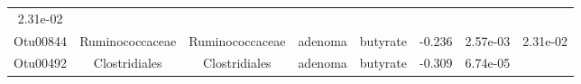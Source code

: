 \documentclass[11pt,]{article}
\begin{document}
\begin{longtable}[]{@{}cccccccc@{}}
\begin{minipage}[t]{0.08\columnwidth}
2.31e-02\strut
\end{minipage}\tabularnewline
\begin{minipage}[t]{0.08\columnwidth}\centering\strut
Otu00844\strut
\end{minipage} & \begin{minipage}[t]{0.15\columnwidth}\centering\strut
Ruminococcaceae\strut
\end{minipage} & \begin{minipage}[t]{0.15\columnwidth}\centering\strut
Ruminococcaceae\strut
\end{minipage} & \begin{minipage}[t]{0.08\columnwidth}\centering\strut
adenoma\strut
\end{minipage} & \begin{minipage}[t]{0.09\columnwidth}\centering\strut
butyrate\strut
\end{minipage} & \begin{minipage}[t]{0.07\columnwidth}\centering\strut
-0.236\strut
\end{minipage} & \begin{minipage}[t]{0.08\columnwidth}\centering\strut
2.57e-03\strut
\end{minipage} & \begin{minipage}[t]{0.08\columnwidth}\centering\strut
2.31e-02\strut
\end{minipage}\tabularnewline
\begin{minipage}[t]{0.08\columnwidth}\centering\strut
Otu00492\strut
\end{minipage} & \begin{minipage}[t]{0.15\columnwidth}\centering\strut
Clostridiales\strut
\end{minipage} & \begin{minipage}[t]{0.15\columnwidth}\centering\strut
Clostridiales\strut
\end{minipage} & \begin{minipage}[t]{0.08\columnwidth}\centering\strut
adenoma\strut
\end{minipage} & \begin{minipage}[t]{0.09\columnwidth}\centering\strut
butyrate\strut
\end{minipage} & \begin{minipage}[t]{0.07\columnwidth}\centering\strut
-0.309\strut
\end{minipage} & \begin{minipage}[t]{0.08\columnwidth}\centering\strut
6.74e-05\strut
\end{minipage} & \begin{minipage}[t]{0.08\columnwidth}\centering\strut

\end{minipage}
\end{longtable}
\end{document}
